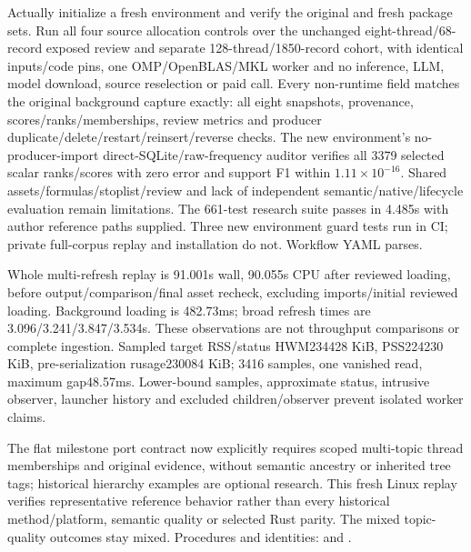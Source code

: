 \documentclass[11pt]{article}
\begin{document}
Actually initialize a fresh environment and verify the original and fresh
package sets. Run all four source allocation controls over the unchanged
eight-thread/68-record exposed review and separate 128-thread/1850-record
cohort, with identical inputs/code pins, one OMP/OpenBLAS/MKL worker and no
inference, LLM, model download, source reselection or paid call. Every
non-runtime field matches the original background capture exactly: all eight
snapshots, provenance, scores/ranks/memberships, review metrics and producer
duplicate/delete/restart/reinsert/reverse checks. The new environment's
no-producer-import direct-SQLite/raw-frequency auditor verifies all 3379
selected scalar ranks/scores with zero error and support F1 within
$1.11\times10^{-16}$. Shared assets/formulas/stoplist/review and lack of
independent semantic/native/lifecycle evaluation remain limitations. The
661-test research suite passes in 4.485s with author reference paths supplied.
Three new environment guard tests run in CI; private full-corpus replay and
installation do not. Workflow YAML parses.

Whole multi-refresh replay is 91.001s wall, 90.055s CPU after reviewed loading,
before output/comparison/final asset recheck, excluding imports/initial reviewed
loading. Background loading is 482.73ms; broad refresh times are
3.096/3.241/3.847/3.534s. These observations are not throughput comparisons or
complete ingestion. Sampled target RSS/status HWM234428 KiB, PSS224230 KiB,
pre-serialization rusage230084 KiB; 3416 samples, one vanished read, maximum
gap48.57ms. Lower-bound samples, approximate status, intrusive observer,
launcher history and excluded children/observer prevent isolated worker claims.

The flat milestone port contract now explicitly requires scoped multi-topic
thread memberships and original evidence, without semantic ancestry or inherited
tree tags; historical hierarchy examples are optional research. This fresh
Linux replay verifies representative reference behavior rather than every
historical method/platform, semantic quality or selected Rust parity. The mixed
topic-quality outcomes stay mixed. Procedures and identities:
 and
.
\end{document}
